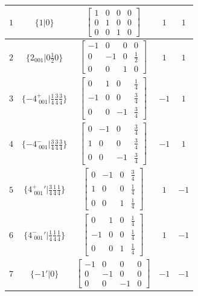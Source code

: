 \documentclass[fleqn,8pt]{jsarticle}
\begin{document}
\begin{longtable}{ccccc}
$ 1 $ & $ \{1|0\} $ & $ \begin{bmatrix} 1 & 0 & 0 & 0 \\ 0 & 1 & 0 & 0 \\ 0 & 0 & 1 & 0 \end{bmatrix} $ & $ 1 $ & $ 1 $ \\ \hline
$ 2 $ & $ \{2{}_{001}|0 \frac{1}{2} 0\} $ & $ \begin{bmatrix} -1 & 0 & 0 & 0 \\ 0 & -1 & 0 & \frac{1}{2} \\ 0 & 0 & 1 & 0 \end{bmatrix} $ & $ 1 $ & $ 1 $ \\ \hline
$ 3 $ & $ \{-4^{+}_{\,\,001}|\frac{1}{4} \frac{3}{4} \frac{3}{4}\} $ & $ \begin{bmatrix} 0 & 1 & 0 & \frac{1}{4} \\ -1 & 0 & 0 & \frac{3}{4} \\ 0 & 0 & -1 & \frac{3}{4} \end{bmatrix} $ & $ -1 $ & $ 1 $ \\ \hline
$ 4 $ & $ \{-4^{-}_{\,\,001}|\frac{3}{4} \frac{3}{4} \frac{3}{4}\} $ & $ \begin{bmatrix} 0 & -1 & 0 & \frac{3}{4} \\ 1 & 0 & 0 & \frac{3}{4} \\ 0 & 0 & -1 & \frac{3}{4} \end{bmatrix} $ & $ -1 $ & $ 1 $ \\ \hline
$ 5 $ & $ \{4^{+}_{\,\,001}{}'|\frac{3}{4} \frac{1}{4} \frac{1}{4}\} $ & $ \begin{bmatrix} 0 & -1 & 0 & \frac{3}{4} \\ 1 & 0 & 0 & \frac{1}{4} \\ 0 & 0 & 1 & \frac{1}{4} \end{bmatrix} $ & $ 1 $ & $ -1 $ \\ \hline
$ 6 $ & $ \{4^{-}_{\,\,001}{}'|\frac{1}{4} \frac{1}{4} \frac{1}{4}\} $ & $ \begin{bmatrix} 0 & 1 & 0 & \frac{1}{4} \\ -1 & 0 & 0 & \frac{1}{4} \\ 0 & 0 & 1 & \frac{1}{4} \end{bmatrix} $ & $ 1 $ & $ -1 $ \\ \hline
$ 7 $ & $ \{-1{}'|0\} $ & $ \begin{bmatrix} -1 & 0 & 0 & 0 \\ 0 & -1 & 0 & 0 \\ 0 & 0 & -1 & 0 \end{bmatrix} $ & $ -1 $ & $ -1 $ \\ \hline

\end{longtable}
\end{document}
